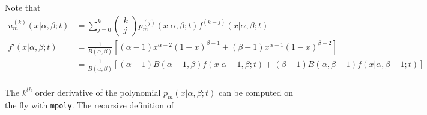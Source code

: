 \documentclass[10pt]{article}
\begin{document}
Note that
\begin{align*}
  u_m^{(k)}(x|\alpha,\beta;t) &= \sum_{j=0}^k \left(\begin{array}{c}
                                                      k \\
                                                      j
                                                      \end{array} \right)
  p^{(j)}_m(x|\alpha,\beta;t) f^{(k-j)}(x|\alpha,\beta;t) \\
  f'(x|\alpha,\beta;t) &= \frac{1}{B(\alpha,\beta)}
                         \left[(\alpha-1)x^{\alpha-2}(1-x)^{\beta-1}
                         + (\beta-1)x^{\alpha-1}(1-x)^{\beta-2} \right] \\
                         &= \frac{1}{B(\alpha,\beta)}
                         \left[(\alpha-1)B(\alpha-1,\beta) f(x|\alpha-1,\beta;t)
                           + (\beta-1)B(\alpha,\beta-1)
                           f(x|\alpha,\beta-1;t) \right] \\
\end{align*}

The $k^{th}$ order derivative of the polynomial $p_m(x|\alpha,\beta;t)$ can be
computed on the fly with \texttt{mpoly}. The recursive definition of 
\end{document}
